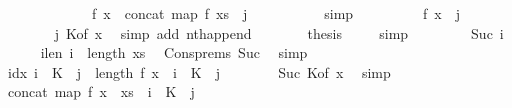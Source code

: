 \begin{isabellebody}
\ \ \ \ \ \ \ \ \ \ \ \ {\isacharequal}{\kern0pt}\ {\isacharparenleft}{\kern0pt}f\ x\ {\isacharat}{\kern0pt}\ concat\ {\isacharparenleft}{\kern0pt}map\ f\ xs{\isacharparenright}{\kern0pt}{\isacharparenright}{\kern0pt}\ {\isacharbang}{\kern0pt}\ j{\isachardoublequoteclose}\isanewline
\ \ \ \ \ \ \isamarkupfalse%
\ {}\ \isamarkupfalse%
\ simp\isanewline
\ \ \ \ \isamarkupfalse%
\ \isamarkupfalse%
\ {\isachardoublequoteopen}{\isasymdots}\ {\isacharequal}{\kern0pt}\ f\ x\ {\isacharbang}{\kern0pt}\ j{\isachardoublequoteclose}\isanewline
\ \ \ \ \ \ \isamarkupfalse%
\ j\ K{\isacharbrackleft}{\kern0pt}of\ x{\isacharbrackright}{\kern0pt}\ \isamarkupfalse%
\ {\isacharparenleft}{\kern0pt}simp\ add{\isacharcolon}{\kern0pt}\ nth{\isacharunderscore}{\kern0pt}append{\isacharparenright}{\kern0pt}\isanewline
\ \ \ \ \isamarkupfalse%
\ \isamarkupfalse%
\ {\isacharquery}{\kern0pt}thesis\ \isamarkupfalse%
\ {}\ \isamarkupfalse%
\ simp\isanewline
\ \ \isamarkupfalse%
\isanewline
\ \ \ \ \isamarkupfalse%
\ {\isacharparenleft}{\kern0pt}Suc\ i{\isacharprime}{\kern0pt}{\isacharparenright}{\kern0pt}\isanewline
\ \ \ \ \isamarkupfalse%
\ i{\isacharprime}{\kern0pt}len{\isacharcolon}{\kern0pt}\ {\isachardoublequoteopen}i{\isacharprime}{\kern0pt}\ {\isacharless}{\kern0pt}\ length\ xs{\isachardoublequoteclose}\ \isamarkupfalse%
\ Cons{\isachardot}{\kern0pt}prems\ Suc\ \isamarkupfalse%
\ simp\isanewline
\ \ \ \ \isamarkupfalse%
\ idx{\isacharcolon}{\kern0pt}\ {\isachardoublequoteopen}i\ {\isacharasterisk}{\kern0pt}\ K\ {\isacharplus}{\kern0pt}\ j\ {\isacharequal}{\kern0pt}\ length\ {\isacharparenleft}{\kern0pt}f\ x{\isacharparenright}{\kern0pt}\ {\isacharplus}{\kern0pt}\ {\isacharparenleft}{\kern0pt}i{\isacharprime}{\kern0pt}\ {\isacharasterisk}{\kern0pt}\ K\ {\isacharplus}{\kern0pt}\ j{\isacharparenright}{\kern0pt}{\isachardoublequoteclose}\isanewline
\ \ \ \ \ \ \isamarkupfalse%
\ Suc\ K{\isacharbrackleft}{\kern0pt}of\ x{\isacharbrackright}{\kern0pt}\ \isamarkupfalse%
\ simp\isanewline
\ \ \ \ \isamarkupfalse%
\ {\isachardoublequoteopen}concat\ {\isacharparenleft}{\kern0pt}map\ f\ {\isacharparenleft}{\kern0pt}x\ {\isacharhash}{\kern0pt}\ xs{\isacharparenright}{\kern0pt}{\isacharparenright}{\kern0pt}\ {\isacharbang}{\kern0pt}\ {\isacharparenleft}{\kern0pt}i\ {\isacharasterisk}{\kern0pt}\ K\ {\isacharplus}{\kern0pt}\ j{\isacharparenright}{\kern0pt}\isanewline

\end{isabellebody}

